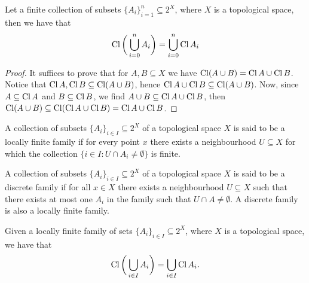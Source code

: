 \begin{proposition}\label{prop: finite union of closures}
    Let a finite collection of subsets \(\{A_i\}_{i = 1}^n \subseteq 2^X\), where
    \(X\) is a topological space, then we have that
    \[
        \operatorname{Cl}\bigg(\bigcup_{i = 0}^n A_i\bigg) = \bigcup_{i = 0}^n \operatorname{Cl} A_i
    \]
\end{proposition}

\begin{proof}
    It suffices to prove that for \(A, B \subseteq X\) we have \(\operatorname{Cl}(A \cup
    B) = \operatorname{Cl} A \cup \operatorname{Cl} B\). Notice that \(\operatorname{Cl} A,
    \operatorname{Cl} B \subseteq \operatorname{Cl}(A \cup B)\), hence \(\operatorname{Cl} A \cup
    \operatorname{Cl} B \subseteq \operatorname{Cl}(A \cup B)\). Now, since \(A \subseteq
    \operatorname{Cl} A\) and \(B \subseteq \operatorname{Cl} B\), we find \(A \cup B \subseteq
    \operatorname{Cl} A \cup \operatorname{Cl} B\), then \(\operatorname{Cl}(A \cup B) \subseteq
    \operatorname{Cl}(\operatorname{Cl} A \cup \operatorname{Cl} B) = \operatorname{Cl} A \cup \operatorname{Cl} B\).
\end{proof}

\begin{definition}
    A collection of subsets \(\{A_i\}_{i \in I} \subseteq 2^X\) of a topological
    space \(X\) is said to be a locally finite family if for every point \(x\)
    there exists a neighbourhood \(U \subseteq X\) for which the collection \(\{i
    \in I \colon U \cap A_i \neq \emptyset\}\) is finite.
\end{definition}

\begin{definition}
    A collection of subsets \(\{A_i\}_{i \in I} \subseteq 2^X\) of a topological
    space \(X\) is said to be a discrete family if for all \(x \in X\) there
    exists a neighbourhood \(U \subseteq X\) such that there exists at most one
    \(A_i\) in the family such that \(U \cap A \neq \emptyset\). A discrete family
    is also a locally finite family.
\end{definition}

\begin{proposition}
    Given a locally finite family of sets \(\{A_i\}_{i \in I} \subseteq 2^X\),
    where \(X\) is a topological space, we have that
    \[
        \operatorname{Cl}\bigg(\bigcup_{i \in  I} A_i\bigg) = \bigcup_{i \in  I} \operatorname{Cl} A_i.
    \]
\end{proposition}

